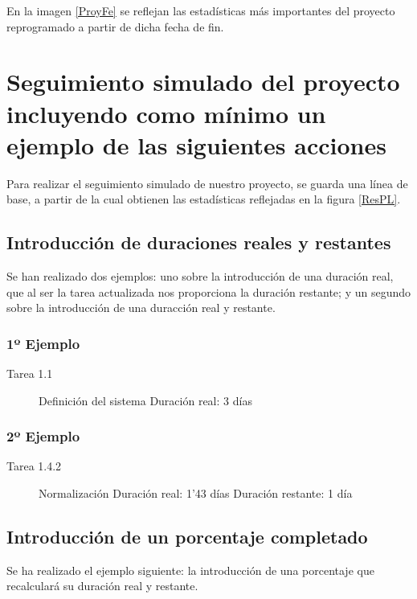 \documentclass[11pt,a4paper,spanish,twoside]{book}
\begin{document}
En la imagen \ref{ProyFe} se reflejan las estadísticas más importantes del
proyecto reprogramado a partir de dicha fecha de fin.

\chapter{Seguimiento simulado del proyecto incluyendo como 
  mínimo un ejemplo de las siguientes acciones}
Para realizar el seguimiento simulado de nuestro proyecto, se guarda una línea 
de base, a partir de la cual obtienen las estadísticas reflejadas en la figura 
\ref{ResPL}.


\section{Introducción de duraciones reales y restantes}
Se han realizado dos ejemplos: uno sobre la introducción de una duración
real, que al ser la tarea actualizada nos proporciona la duración restante; y
un segundo sobre la introducción de una duracción real y restante.

\subsection{1º Ejemplo}
\begin{description}
\item[Tarea 1.1] Definición del sistema \hfill
  Duración real: 3 días
\end{description}
\subsection{2º Ejemplo}
\begin{description}
\item[Tarea 1.4.2] Normalización \hfill
  Duración real: 1'43 días
  Duración restante: 1 día
\end{description}

\section{Introducción de un porcentaje completado}
Se ha realizado el ejemplo siguiente: la introducción de una porcentaje que 
recalculará su duración real y restante.
\end{document}
